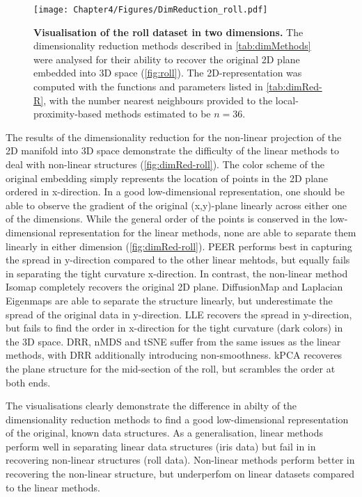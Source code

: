 \begin{figure}[hbtp]
	\centering
	\texttt{[image: Chapter4/Figures/DimReduction\_roll.pdf]}
	\caption[\textbf{Visualisation of the roll dataset in two dimensions.}]{\textbf{Visualisation of the roll dataset in two dimensions.} The dimensionality reduction methods described in \cref{tab:dimMethods} were analysed for their ability to recover the original 2D plane embedded into 3D space (\cref{fig:roll}). The 2D-representation was computed with the functions and parameters listed in \cref{tab:dimRed-R}, with the number nearest neighbours provided to the local-proximity-based methods estimated to be \(n=36\). } 
	 	\label{fig:TandC-roll}
\end{figure}


The results of the dimensionality reduction for the non-linear projection of the 2D manifold into 3D space demonstrate the difficulty of the linear methods to deal with non-linear structures (\cref{fig:dimRed-roll}). The color scheme of the original embedding simply represents the location of points in the 2D plane ordered in x-direction. In a good low-dimensional representation, one should be able to observe the gradient of the original (x,y)-plane linearly across either one of the dimensions. While the general order of the points is conserved in the low-dimensional representation for the linear methods, none are able to separate them linearly in either dimension (\cref{fig:dimRed-roll}). PEER performs best in capturing the spread in y-direction compared to the other linear mehtods, but equally fails in separating the tight curvature x-direction. In contrast, the non-linear method Isomap completely recovers the original 2D plane. DiffusionMap and Laplacian Eigenmaps are able to separate the structure linearly, but underestimate the spread of the original data in y-direction. LLE recovers the spread in y-direction, but fails to find the order in x-direction for the tight curvature (dark colors) in the 3D space. DRR, nMDS and tSNE suffer from the same issues as the linear methods, with DRR additionally introducing non-smoothness. kPCA recoveres the plane structure for the mid-section of the roll, but scrambles the order at both ends. 

The visualisations clearly demonstrate the difference in abilty of the dimensionality reduction methods to find a good low-dimensional representation of the original, known data structures. As a generalisation, linear methods perform well in separating linear data structures (iris data) but fail in in recovering non-linear structures (roll data). Non-linear methods perform better in recovering the non-linear structure, but underperfom on linear datasets compared to the linear methods. 

